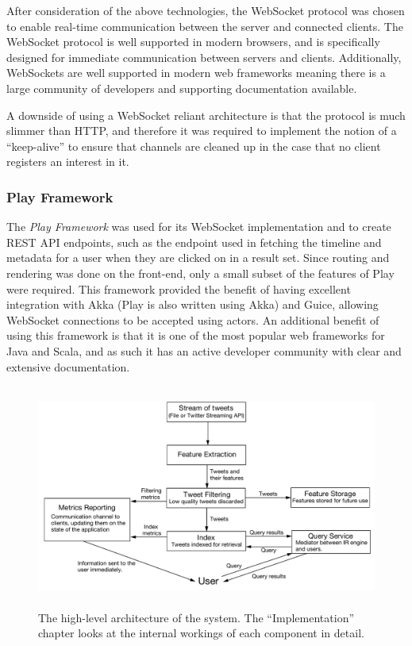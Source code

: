 \documentclass{l4proj}
\begin{document}
       After consideration of the above technologies, the WebSocket protocol was chosen to enable real-time communication between the server and connected clients. The WebSocket protocol is well supported in modern browsers, and is specifically designed for immediate communication between servers and clients. Additionally, WebSockets are well supported in modern web frameworks meaning there is a large community of developers  and supporting documentation available.
          
        A downside of using a WebSocket reliant architecture is that the protocol is much slimmer than HTTP, and therefore it was required to implement the notion of a ``keep-alive'' to ensure that channels are cleaned up in the case that no client registers an interest in it.
        
                \subsubsection{Play Framework}
        The \textit{Play Framework} was used for its WebSocket implementation and to create REST API endpoints, such as the endpoint used in fetching the timeline and metadata for a user when they are clicked on in a result set. Since routing and rendering was done on the front-end, only a small subset of the features of Play were required. This framework provided the benefit of having excellent integration with Akka (Play is also written using Akka) and Guice, allowing WebSocket connections to be accepted using actors. An additional benefit of using this framework is that it is one of the most popular web frameworks for Java and Scala, and as such it has an active developer community with clear and extensive documentation.
        
\begin{figure}
\centering
\includegraphics[height=278px,width=496px]{architecture.pdf}
\caption{The high-level architecture of the system. The ``Implementation'' chapter looks at the internal workings of each component in detail.}
\label{architecture}
\end{figure}
        
\end{document}
